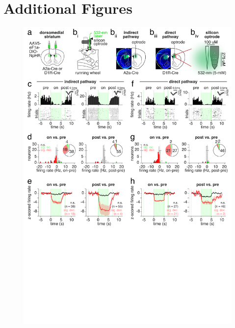 \section{Additional Figures}
\label{sec:appendix1:add_figures}

\begin{figure}[t!]
  \begin{center}
    \includegraphics[width=0.90\linewidth]{ch7-appendix1/appendix1-figures/ExtData_Fig1.pdf}

\end{center}
\end{figure}
